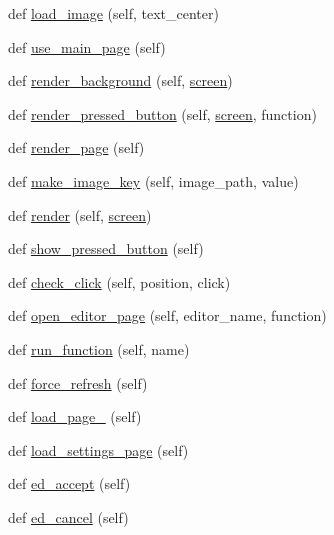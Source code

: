 \begin{DoxyCompactItemize}
def \hyperlink{classlayout_1_1layout_a1b573b32602a66ec97122d5931ecab77}{load\+\_\+image} (self, text\+\_\+center)
\item 
def \hyperlink{classlayout_1_1layout_a915717bcd06193f482be2d3589f39d35}{use\+\_\+main\+\_\+page} (self)
\item 
def \hyperlink{classlayout_1_1layout_aa200719d593ee03ec498e80c5df237b0}{render\+\_\+background} (self, \hyperlink{classlayout_1_1layout_aa588f7b44d84ec47ee98b72d8931b32c}{screen})
\item 
def \hyperlink{classlayout_1_1layout_ae261bab4b37b3348bb40a4e2b68b7e58}{render\+\_\+pressed\+\_\+button} (self, \hyperlink{classlayout_1_1layout_aa588f7b44d84ec47ee98b72d8931b32c}{screen}, function)
\item 
def \hyperlink{classlayout_1_1layout_abd46ee3f166659e915b84683c0ffb0ec}{render\+\_\+page} (self)
\item 
def \hyperlink{classlayout_1_1layout_abc33e3886bca018ac33da77dd4665f81}{make\+\_\+image\+\_\+key} (self, image\+\_\+path, value)
\item 
def \hyperlink{classlayout_1_1layout_a338f0c3d04a721a701c3314c373a48f9}{render} (self, \hyperlink{classlayout_1_1layout_aa588f7b44d84ec47ee98b72d8931b32c}{screen})
\item 
def \hyperlink{classlayout_1_1layout_a8f9f8eb17c9a17bbc794fbef0a76a1c2}{show\+\_\+pressed\+\_\+button} (self)
\item 
def \hyperlink{classlayout_1_1layout_a1a4821d5cfdcbbc1c6bccccf3ee67039}{check\+\_\+click} (self, position, click)
\item 
def \hyperlink{classlayout_1_1layout_adfea7db87304e6bae605e923ce55c92f}{open\+\_\+editor\+\_\+page} (self, editor\+\_\+name, function)
\item 
def \hyperlink{classlayout_1_1layout_a0825882f1e0abfa53dd1d21c8eb5deba}{run\+\_\+function} (self, name)
\item 
def \hyperlink{classlayout_1_1layout_a38a02d29f24a3fe87472a4c77432b663}{force\+\_\+refresh} (self)
\item 
def \hyperlink{classlayout_1_1layout_aa098e066333cb4deb0ff6187c0295e50}{load\+\_\+page\+\_} (self)
\item 
def \hyperlink{classlayout_1_1layout_a321003a72646314f4f626c37ea66fa2e}{load\+\_\+settings\+\_\+page} (self)
\item 
def \hyperlink{classlayout_1_1layout_a6bc6dd51cd0974eed07281fb63f8f293}{ed\+\_\+accept} (self)
\item 
def \hyperlink{classlayout_1_1layout_a866dcbea40c0fb70b194137fd98a6ced}{ed\+\_\+cancel} (self)

\end{DoxyCompactItemize}
